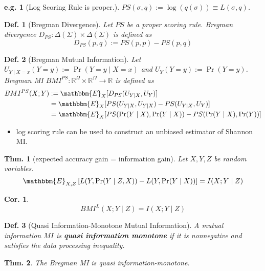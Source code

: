 \documentclass[11pt,a4paper,dvipdfmx]{article}
\theoremstyle{plain}
\newtheorem{thm}{Thm.}[section]
\newtheorem{cor}{Cor.}[section]
\newtheorem{df}{Def.}[section]
\newtheorem{eg}{e.g.}[section]
\newcommand{\R}{\mathbb{R}}
\newcommand{\E}{\mathbbm{E}}
\newcommand{\1}{\mathbbm{1}}
\begin{document}
\begin{eg}[Log Scoring Rule is proper.]
	$PS(\sigma, q) := \log(q(\sigma)) \equiv L(\sigma, q)$.
\end{eg}

\begin{df}[Bregman Divergence]
	Let $PS$ be a proper scoring rule.
	Bregman divergence $D_{PS}: \Delta(\Sigma) \times \Delta(\Sigma)$ is defined as
	$$
	D_{PS}(p,q) := PS(p,p) - PS(p,q)
	$$
\end{df}
\begin{df}[Bregman Mutual Information]
	Let $U_{Y \mid X = x}(Y = y) := \Pr(Y = y \mid X = x)$ and $U_Y(Y = y) := \Pr(Y = y)$. Bregman MI $BMI^{PS}: \R^\Omega \times \R^\Omega \to \R$ is defined as
	\begin{align*}
		BMI^{PS}(X; Y) &:= \E_X[ D_{PS}(U_{Y \mid X}, U_Y) ] \\
		&= \E_X[PS(U_{Y \mid X}, U_{Y \mid X}) - PS(U_{Y \mid X}, U_Y)] \\
		&= \E_X[PS(\Pr(Y \mid X), \Pr(Y \mid X)) - PS(\Pr(Y \mid X), \Pr(Y))]
	\end{align*}
	
	
\end{df}

\begin{itemize}
	\item log scoring rule can be used to construct an unbiased estimator of Shannon MI.
\end{itemize}


\begin{screen}
\begin{thm}[expected accuracy gain = information gain]
	Let $X,Y,Z$ be random variables.
	\[
	\E_{X,Z}\left[
	L(Y, \Pr(Y \mid Z,X)) - L(Y, \Pr(Y \mid X))
	\right]
	= I(X;Y \mid Z)
	\]
\end{thm}
\begin{cor}
\[
BMI^{L}(X;Y \mid Z) = I(X;Y \mid Z)
\]	
\end{cor}
\end{screen}

\begin{df}[Quasi Information-Monotone Mutual Information]
	A mutual information $MI$ is \textbf{quasi information monotone} if it is nonnegative and satisfies the data processing inequality.
\end{df}
\begin{thm}
	The Bregman MI is quasi information-monotone.
\end{thm}
\end{document}
